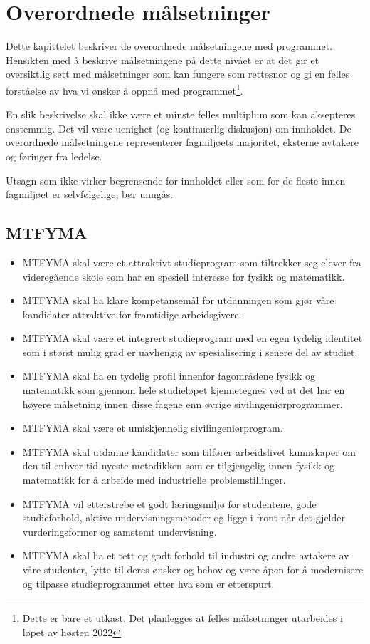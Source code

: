 \chapter{Overordnede målsetninger}

Dette kapittelet beskriver de overordnede målsetningene med programmet. Hensikten med å beskrive målsetningene på dette nivået er at det gir et oversiktlig sett med målsetninger som kan fungere som rettesnor og gi en felles forståelse av hva vi ønsker å oppnå med programmet\footnote{Dette er bare et utkast. Det planlegges at felles målsetninger utarbeides i løpet av høsten 2022}.

En slik beskrivelse skal ikke være et minste felles multiplum som kan aksepteres enstemmig. Det vil være uenighet (og kontinuerlig diskusjon) om innholdet. De overordnede målsetningene representerer fagmiljøets majoritet, eksterne avtakere og føringer fra ledelse.

Utsagn som ikke virker begrensende for innholdet eller som for de fleste innen fagmiljøet er selvfølgelige, bør unngås.

\section{MTFYMA}

\begin{itemize}
	\item MTFYMA skal være et attraktivt studieprogram som tiltrekker seg elever fra videregående skole som har en spesiell interesse for fysikk og matematikk.
	\item MTFYMA skal ha klare kompetansemål for utdanningen som gjør våre kandidater attraktive for framtidige arbeidsgivere.
	\item MTFYMA skal være et integrert studieprogram med en egen tydelig identitet som i størst mulig grad er uavhengig av spesialisering i senere del av studiet.
	\item MTFYMA skal ha en tydelig profil innenfor fagområdene fysikk og matematikk som gjennom hele studieløpet kjennetegnes ved at det har en høyere målsetning innen disse fagene enn øvrige sivilingeniørprogrammer.
	\item MTFYMA skal være et umiskjennelig sivilingeniørprogram.
	\item MTFYMA skal utdanne kandidater som tilfører arbeidslivet kunnskaper om den til enhver tid nyeste metodikken som er tilgjengelig innen fysikk og matematikk for å arbeide med industrielle problemstillinger.
	\item MTFYMA vil etterstrebe et godt læringsmiljø for studentene, gode studieforhold, aktive undervisningsmetoder og ligge i front når det gjelder vurderingsformer og samstemt undervisning.
	\item MTFYMA skal ha et tett og godt forhold til industri og andre avtakere av våre studenter, lytte til deres ønsker og behov og være åpen for å modernisere og tilpasse studieprogrammet etter hva som er etterspurt.
\end{itemize}

